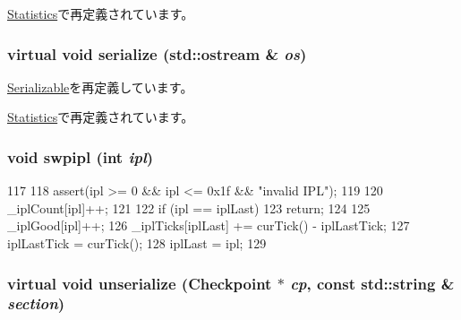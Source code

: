 \hyperlink{classAlphaISA_1_1Kernel_1_1Statistics_a3dd3443357312bcb75580eaa508c48a4}{Statistics}で再定義されています。\hypertarget{classKernel_1_1Statistics_ad6272f80ae37e8331e3969b3f072a801}{
\subsubsection[{serialize}]{\setlength{\rightskip}{0pt plus 5cm}virtual void serialize (std::ostream \& {\em os})}}
\label{classKernel_1_1Statistics_ad6272f80ae37e8331e3969b3f072a801}


\hyperlink{classSerializable_ad6272f80ae37e8331e3969b3f072a801}{Serializable}を再定義しています。

\hyperlink{classAlphaISA_1_1Kernel_1_1Statistics_a53e036786d17361be4c7320d39c99b84}{Statistics}で再定義されています。\hypertarget{classKernel_1_1Statistics_afb2ab1d7d1dbe5044402867ab17401dc}{
\subsubsection[{swpipl}]{\setlength{\rightskip}{0pt plus 5cm}void swpipl (int {\em ipl})}}
\label{classKernel_1_1Statistics_afb2ab1d7d1dbe5044402867ab17401dc}



\begin{DoxyCode}
117 {
118     assert(ipl >= 0 && ipl <= 0x1f && "invalid IPL\n");
119 
120     _iplCount[ipl]++;
121 
122     if (ipl == iplLast)
123         return;
124 
125     _iplGood[ipl]++;
126     _iplTicks[iplLast] += curTick() - iplLastTick;
127     iplLastTick = curTick();
128     iplLast = ipl;
129 }
\end{DoxyCode}
\hypertarget{classKernel_1_1Statistics_af100c4e9feabf3cd918619c88c718387}{
\subsubsection[{unserialize}]{\setlength{\rightskip}{0pt plus 5cm}virtual void unserialize ({\bf Checkpoint} $\ast$ {\em cp}, \/  const std::string \& {\em section})}}
\label{classKernel_1_1Statistics_af100c4e9feabf3cd918619c88c718387}


